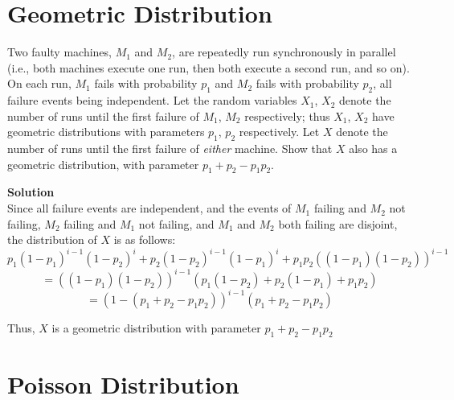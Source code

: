 \documentclass[11pt]{article}
\newcommand*{\Question}[1]{\section{#1}}
\newenvironment{Answer}{\vspace{10pt}\begin{mdframed}\textbf{Solution}\\}{\end{mdframed}\vfill\pagebreak[3]}
\newenvironment{Answer}{\vspace{10pt}}{\vfill\pagebreak[3]}
\begin{document}
\Question{Geometric Distribution}

Two faulty machines, $M_1$ and $M_2$, are repeatedly run synchronously in parallel (i.e., both machines execute one run, then both execute a second run, and so on). On each run, $M_1$ fails with probability $p_1$ and $M_2$ fails with probability $p_2$, all failure events being independent. Let the random variables $X_1$, $X_2$ denote the number of runs until the first failure of $M_1$, $M_2$ respectively; thus $X_1$, $X_2$ have geometric distributions with parameters $p_1$, $p_2$ respectively. Let $X$ denote the number of runs until the first failure of \emph{either} machine. Show that $X$ also has a geometric distribution, with parameter $p_1+p_2-p_1p_2$.

\begin{Answer}
Since all failure events are independent, and the events of $M_1$ failing and $M_2$ not failing, $M_2$ failing and $M_1$ not failing, and $M_1$ and $M_2$ both failing are disjoint, the distribution of $X$ is as follows:
$$p_1(1-p_1)^{i-1}(1-p_2)^i+p_2(1-p_2)^{i-1}(1-p_1)^i+p_1p_2((1-p_1)(1-p_2))^{i-1}$$
$$=((1-p_1)(1-p_2))^{i-1}(p_1(1-p_2)+p_2(1-p_1)+p_1p_2)$$
$$=(1-(p_1+p_2-p_1p_2))^{i-1}(p_1+p_2-p_1p_2)$$

Thus, $X$ is a geometric distribution with parameter $p_1+p_2-p_1p_2$
\end{Answer}


\Question{Poisson Distribution}
\end{document}

